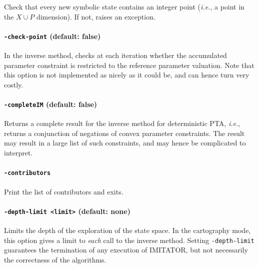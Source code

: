 \documentclass[a4paper,11pt]{report}
\makeatletter
\newcommand{\Clock}{X} %
\newcommand{\Param}{P} %
\newcommand{\imitator}{\textsf{IMITATOR}}
\newcommand{\styleOption}[1]{\textcolor{optioncolor}{\texttt{#1}}}
\newcommand{\ie}{\textcolor{colorok}{\textit{i.e.},\@}}
\makeatother
\begin{document}
Check that every new symbolic state contains an integer point (\ie{} a point in the $\Clock \cup \Param$ dimension).
If not, raises an exception.


\paragraph{\styleOption{-check-point} (default: false)}

In the inverse method, checks at each iteration whether the accumulated parameter constraint is restricted to the reference parameter valuation.
Note that this option is not implemented as nicely as it could be, and can hence turn very costly.


\paragraph{\styleOption{-completeIM} (default: false)}

Returns a complete result for the inverse method for deterministic PTA, \ie{} returns a conjunction of negations of convex parameter constraints.
The result may result in a large list of such constraints, and may hence be complicated to interpret.


\paragraph{\styleOption{-contributors}}
Print the list of contributors and exits.


\paragraph{\styleOption{-depth-limit <limit>} (default: none)}
Limits the depth of the exploration of the state space.
In the cartography mode, this option gives a limit to \emph{each} call to the inverse method.
Setting \styleOption{-depth-limit} guarantees the termination of any execution of \imitator{}, but not necessarily the correctness of the algorithms.
\end{document}
